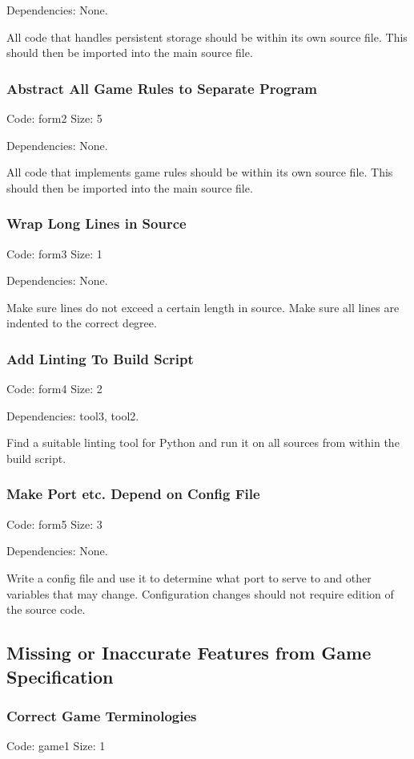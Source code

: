 \documentclass[a4paper,12pt]{article}
\begin{document}
Dependencies: None.

All code that handles persistent storage should be within its own source file. This should then be imported into the main source file.

\subsubsection{Abstract All Game Rules to Separate Program}
Code: form2	\hfill Size: 5

Dependencies: None.

All code that implements game rules should be within its own source file. This should then be imported into the main source file.

\subsubsection{Wrap Long Lines in Source}
Code: form3	\hfill Size: 1

Dependencies: None.

Make sure lines do not exceed a certain length in source. Make sure all lines are indented to the correct degree.

\subsubsection{Add Linting To Build Script}
Code: form4	\hfill Size: 2

Dependencies: tool3, tool2.

Find a suitable linting tool for Python and run it on all sources from within the build script.

\subsubsection{Make Port etc. Depend on Config File}
Code: form5	\hfill Size: 3

Dependencies: None.

Write a config file and use it to determine what port to serve to and other variables that may change. Configuration changes should not require edition of the source code.


\subsection{Missing or Inaccurate Features from Game Specification}

\subsubsection{Correct Game Terminologies}
Code: game1 \hfill Size: 1
\end{document}
